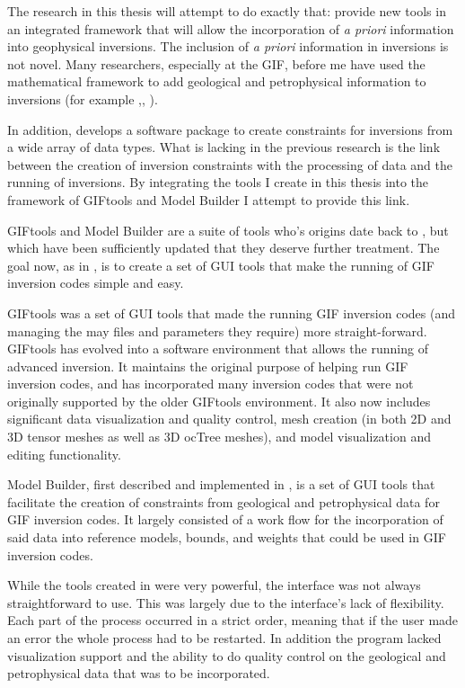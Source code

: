 The research in this thesis will attempt to do exactly that: provide new tools in an integrated framework that will allow the incorporation of \emph{a priori} information into geophysical inversions. The inclusion of \emph{a priori} information in inversions is not novel. Many researchers, especially at the \ac{GIF}, before me have used the mathematical framework to add geological and petrophysical information to inversions (for example \citealt{Lelievre2009Integrating},\citealt{phillips2001thesis}, \citealt{farquharson2008geologically}). 

In addition, \cite{williams2008geologically} develops a software package to create constraints for inversions from a wide array of data types. What is lacking in the previous research is the link between the creation of inversion constraints with the processing of data and the running of inversions. By integrating the tools I create in this thesis into the framework of GIFtools and Model Builder I attempt to provide this link. 

GIFtools and Model Builder are a suite of tools who's origins date back to \cite{williams2008geologically}, but which have been sufficiently updated that they deserve further treatment. The goal now, as in \cite{williams2008geologically}, is to create a set of \ac{GUI} tools that make the running of \ac{GIF} inversion codes simple and easy. 

GIFtools was a set of \ac{GUI} tools that made the running \ac{GIF} inversion codes (and managing the may files and parameters they require) more straight-forward. GIFtools has evolved into a software environment that allows the running of advanced inversion. It maintains the original purpose of helping run \ac{GIF} inversion codes, and has incorporated many inversion codes that were not originally supported by the older GIFtools environment. It also now includes significant data visualization and quality control, mesh creation (in both 2D and 3D tensor meshes as well as 3D ocTree meshes), and model visualization and editing functionality.

Model Builder, first described and implemented in \cite{williams2008geologically}, is a set of \ac{GUI} tools that facilitate the creation of constraints from geological and petrophysical data for \ac{GIF} inversion codes. It largely consisted of a work flow for the incorporation of said data into reference models, bounds, and weights that could be used in \ac{GIF} inversion codes. 

While the tools created in \cite{williams2008geologically} were very powerful, the interface was not always straightforward to use. This was largely due to the interface's lack of flexibility. Each part of the process occurred in a strict order, meaning that if the user made an error the whole process had to be restarted. In addition the program lacked visualization support and the ability to do quality control on the geological and petrophysical data that was to be incorporated.

